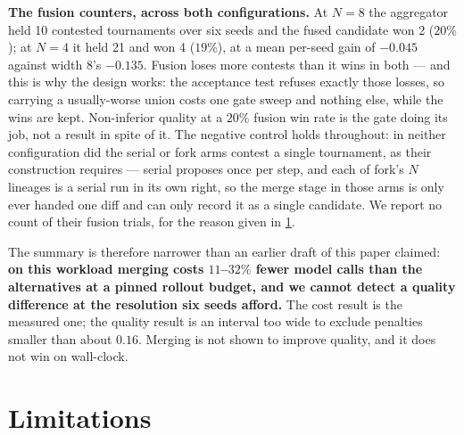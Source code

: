 \documentclass{article}
\begin{document}
\textbf{The fusion counters, across both configurations.} At $N{=}8$ the aggregator held 10 contested tournaments over six seeds and the fused candidate won 2 ($20\%$); at $N{=}4$ it held 21 and won 4 ($19\%$), at a mean per-seed gain of $-0.045$ against width 8's $-0.135$. Fusion loses more contests than it wins in both --- and this is why the design works: the acceptance test refuses exactly those losses, so carrying a usually-worse union costs one gate sweep and nothing else, while the wins are kept. Non-inferior quality at a $20\%$ fusion win rate is the gate doing its job, not a result in spite of it. The negative control holds throughout: in neither configuration did the serial or fork arms contest a single tournament, as their construction requires --- serial proposes once per step, and each of fork's $N$ lineages is a serial run in its own right, so the merge stage in those arms is only ever handed one diff and can only record it as a single candidate. We report no count of their fusion trials, for the reason given in \cref{sec:limits}.

The summary is therefore narrower than an earlier draft of this paper claimed: \textbf{on this workload merging costs $11$--$32\%$ fewer model calls than the alternatives at a pinned rollout budget, and we cannot detect a quality difference at the resolution six seeds afford.} The cost result is the measured one; the quality result is an interval too wide to exclude penalties smaller than about $0.16$. Merging is not shown to improve quality, and it does not win on wall-clock.

\section{Limitations}
\label{sec:limits}
\end{document}
